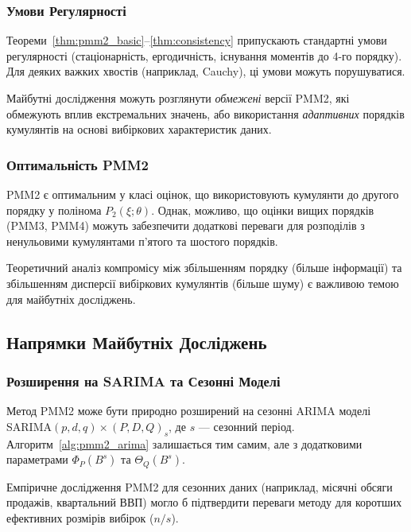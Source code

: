 \documentclass[12pt,a4paper]{article}
\begin{document}
	\subsubsection{Умови Регулярності}
	
	Теореми~\ref{thm:pmm2_basic}--\ref{thm:consistency} припускають стандартні умови регулярності (стаціонарність, ергодичність, існування моментів до 4-го порядку). Для деяких важких хвостів (наприклад, Cauchy), ці умови можуть порушуватися.
	
	Майбутні дослідження можуть розглянути \textit{обмежені} версії PMM2, які обмежують вплив екстремальних значень, або використання \textit{адаптивних} порядків кумулянтів на основі вибіркових характеристик даних.
	
	\subsubsection{Оптимальність PMM2}
	
	PMM2 є оптимальним у класі оцінок, що використовують кумулянти до другого порядку у полінома $P_2(\xi; \theta)$. Однак, можливо, що оцінки вищих порядків (PMM3, PMM4) можуть забезпечити додаткові переваги для розподілів з ненульовими кумулянтами п'ятого та шостого порядків.
	
	Теоретичний аналіз компромісу між збільшенням порядку (більше інформації) та збільшенням дисперсії вибіркових кумулянтів (більше шуму) є важливою темою для майбутніх досліджень.
	
	\subsection{Напрямки Майбутніх Досліджень}
	\label{subsec:future_research}
	
	\subsubsection{Розширення на SARIMA та Сезонні Моделі}
	
	Метод PMM2 може бути природно розширений на сезонні ARIMA моделі SARIMA$(p,d,q) \times (P,D,Q)_s$, де $s$ --- сезонний період. Алгоритм~\ref{alg:pmm2_arima} залишається тим самим, але з додатковими параметрами $\Phi_P(B^s)$ та $\Theta_Q(B^s)$.
	
	Емпіричне дослідження PMM2 для сезонних даних (наприклад, місячні обсяги продажів, квартальний ВВП) могло б підтвердити переваги методу для коротших ефективних розмірів вибірок ($n / s$).
	
\end{document}
